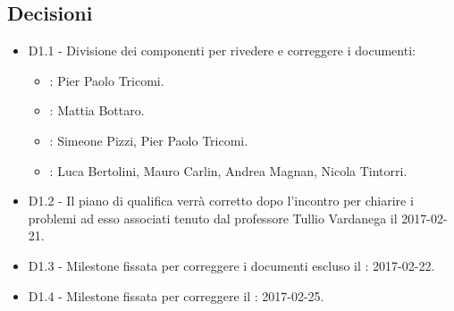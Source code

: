 \documentclass[a4paper,titlepage]{article}
\begin{document}
 \subsection{Decisioni}
 \begin{itemize}
  \item D1.1 - Divisione dei componenti per rivedere e correggere i documenti:
  	\begin{itemize}
  		\item \NPdocRR{}: Pier Paolo Tricomi.
  		\item \PPdocRR{}: Mattia Bottaro.
  		\item \PQdocRR{}: Simeone Pizzi, Pier Paolo Tricomi.
  		\item \ARdocRR{}: Luca Bertolini, Mauro Carlin, Andrea Magnan, Nicola Tintorri.
  	\end{itemize}
  \item D1.2 - Il piano di qualifica verrà corretto dopo l'incontro per chiarire i problemi ad esso associati tenuto dal professore Tullio Vardanega il 2017-02-21.
  \item D1.3 - Milestone fissata per correggere i documenti escluso il \PQdocRR : 2017-02-22.
  \item D1.4 - Milestone fissata per correggere il \PQdocRR : 2017-02-25.
 \end{itemize}
\end{document}
